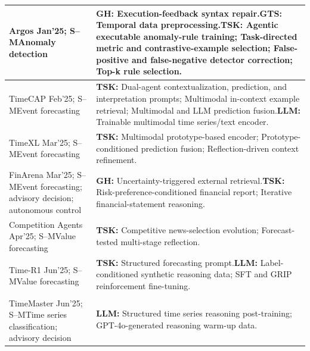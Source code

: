 \documentclass[preprints,article,submit,moreauthors]{Definitions/mdpi}
\newcommand{\typeSMshort}{\textsf{S--M}}
\newcommand{\selfclaim}{\textsuperscript{\dag}}
\begin{document}
\begin{longtable}{@{}>{\raggedright\arraybackslash}p{}p{}@{}}
Argos \citep{argos2025} Jan'25; \typeSMshort{}\newline Anomaly detection & \textbf{GH:} Execution-feedback syntax repair.\newline\textbf{GTS:} Temporal data preprocessing.\newline\textbf{TSK:} Agentic executable anomaly-rule training; Task-directed metric and contrastive-example selection; False-positive and false-negative detector correction; Top-k rule selection.\\\midrule
TimeCAP \citep{timecap2025} Feb'25; \typeSMshort{}\newline Event forecasting & \textbf{TSK:} Dual-agent contextualization, prediction, and interpretation prompts; Multimodal in-context example retrieval; Multimodal and LLM prediction fusion.\newline\textbf{LLM:} Trainable multimodal time series/text encoder.\\\midrule
TimeXL \citep{timexl2025} Mar'25; \typeSMshort{}\newline Event forecasting & \textbf{TSK:} Multimodal prototype-based encoder; Prototype-conditioned prediction fusion; Reflection-driven context refinement.\\\midrule
FinArena \citep{finarena2025} Mar'25; \typeSMshort{}\newline Event forecasting; advisory decision; autonomous control & \textbf{GH:} Uncertainty-triggered external retrieval.\newline\textbf{TSK:} Risk-preference-conditioned financial report; Iterative financial-statement reasoning.\\\midrule
Competition Agents \citep{competitionagents2025} Apr'25; \typeSMshort{}\newline Value forecasting & \textbf{TSK:} Competitive news-selection evolution; Forecast-tested multi-stage reflection.\\\midrule
Time-R1 \citep{timer12025}\selfclaim{} Jun'25; \typeSMshort{}\newline Value forecasting & \textbf{TSK:} Structured forecasting prompt.\newline\textbf{LLM:} Label-conditioned synthetic reasoning data; SFT and GRIP reinforcement fine-tuning.\\\midrule
TimeMaster \citep{timemaster2025}\selfclaim{} Jun'25; \typeSMshort{}\newline Time series classification; advisory decision & \textbf{LLM:} Structured time series reasoning post-training; GPT-4o-generated reasoning warm-up data.\\\midrule

\end{longtable}
\end{document}
